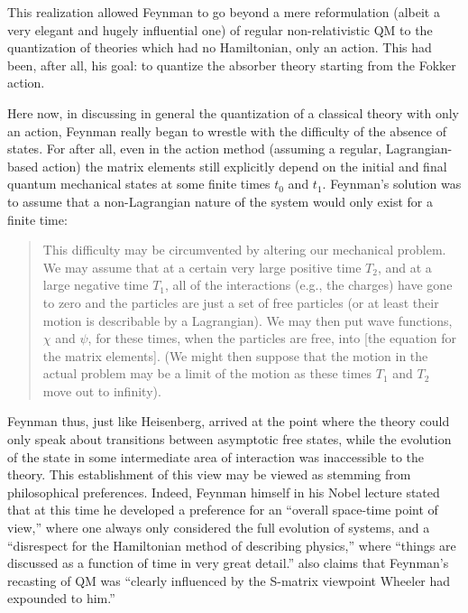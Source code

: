 \documentclass[12pt]{article}
\begin{document}
This realization allowed Feynman to go beyond a mere reformulation (albeit a very elegant and hugely influential one) of regular non-relativistic QM to the quantization of theories which had no Hamiltonian, only an action. This had been, after all, his goal: to quantize the absorber theory starting from the Fokker action.

Here now, in discussing in general the quantization of a classical theory with only an action, Feynman really began to wrestle with the difficulty of the absence of states. For after all, even in the action method (assuming a regular, Lagrangian-based action) the matrix elements still explicitly depend on the initial and final quantum mechanical states at some finite times $t_0$ and $t_1$. Feynman's solution was to assume that a non-Lagrangian nature of the system would only exist for a finite time:

\begin{quote}
This difficulty may be circumvented by altering our mechanical problem. We may assume that at a certain very large positive time $T_2$, and at a large negative time $T_1$, all of the interactions (e.g., the charges) have gone to zero and the particles are just a set of free particles (or at least their motion is describable by a Lagrangian). We may then put wave functions, $\chi$ and $\psi$, for these times, when the particles are free, into [the equation for the matrix elements]. (We might then suppose that the motion in the actual problem may be a limit of the motion as these times $T_1$ and $T_2$ move out to infinity).
\end{quote}

Feynman thus, just like Heisenberg, arrived at the point where the theory could only speak about transitions between asymptotic free states, while the evolution of the state in some intermediate area of interaction was inaccessible to the theory. This establishment of this view may be viewed as stemming from philosophical preferences. Indeed, Feynman himself in his Nobel lecture stated that at this time he developed a preference for an ``overall space-time point of view,'' where one always only considered the full evolution of systems, and a ``disrespect for the Hamiltonian method of describing physics,'' where ``things are discussed as a function of time in very great detail.''  \citet[p. 393]{schweber_1994_qed} also claims that Feynman's recasting of QM was ``clearly influenced by the S-matrix viewpoint Wheeler had expounded to him.''
\end{document}
